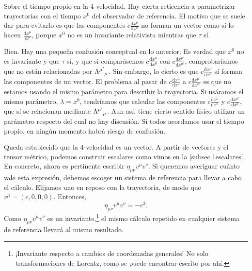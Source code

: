 \begin{observation}
    {Sobre el tiempo propio en la 4-velocidad.}
    \label{obs.1-4_velocidad}
    Hay cierta reticencia a parametrizar trayectorias con el tiempo \(x^0\) del observador de referencia. El motivo que se suele dar para evitarlo es que las componentes \(c\frac{\mathrm{d}x^{\mu}}{\mathrm{d}x^{0}}\) no forman un vector como sí lo hacen \(\frac{\mathrm{d}x^{\mu}}{\mathrm{d}\tau}\), porque \(x^0\) no es un invariante relativista mientras que \(\tau\) sí.

    Bien. Hay una pequeña confusión conceptual en lo anterior. Es verdad que \(x^0\) no es invariante y que \(\tau\) sí, y que si comparásemos \(c\frac{\mathrm{d}x^{\mu}}{\mathrm{d}x^{0}}\) con \(c\frac{\mathrm{d}x^{\mu'}}{\mathrm{d}x^{0'}}\), comprobaríamos que no están relacionadas por \(\tensor{\Lambda}{^{\mu'}_\mu}\). Sin embargo, lo cierto es que \(c\frac{\mathrm{d}x^{\mu}}{\mathrm{d}x^{0}}\) sí forman las componentes de un vector. El problema al pasar de \(c\frac{\mathrm{d}x^{\mu}}{\mathrm{d}x^{0}}\) a \(c\frac{\mathrm{d}x^{\mu'}}{\mathrm{d}x^{0'}}\) es que no estamos usando el mismo parámetro para describir la trayectoria. Si usáramos el mismo parámetro, \(\lambda=x^0\), tendríamos que calcular las componentes 
    \(c\frac{\mathrm{d}x^{\mu}}{\mathrm{d}x^{0}}\) y \(c\frac{\mathrm{d}x^{\mu'}}{\mathrm{d}x^{0}}\), que sí se relacionan mediante \(\tensor{\Lambda}{^{\mu'}_\mu}\). Aun así, tiene cierto sentido físico utilizar un parámetro respecto del cual no hay discusión. Si todos acordamos usar el tiempo propio, en ningún momento habrá riesgo de confusión.
\end{observation}

Queda establecido que la 4-velocidad es un vector. A partir de vectores y el tensor métrico, podemos construir escalares como vimos en la \cref{subsec.1escalares}. En concreto, ahora es pertinente escribir \(\eta_{\mu\nu}v^{\mu}v^\nu\). Si queremos averiguar cuánto vale esta expresión, debemos escoger un sistema de referencia para llevar a cabo el cálculo. Elijamos uno en reposo con la trayectoria, de modo que \(v^\mu=(c, 0, 0, 0)\). Entonces,
\begin{equation}
    \eta_{\mu\nu}v^{\mu}v^\nu = -c^2.
\end{equation}
Como \(\eta_{\mu\nu}v^{\mu}v^\nu\) es un invariante,\footnote{¡Invariante respecto a cambios de coordenadas generales! No solo transformaciones de Lorentz, como se puede encontrar escrito por ahí.} el mismo cálculo repetido en cualquier sistema de referencia llevará al mismo resultado. 


